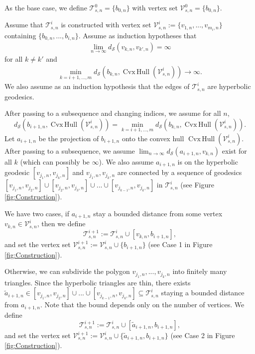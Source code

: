 \documentclass[11pt, reqno]{amsart}
\numberwithin{equation}{section}
\theoremstyle{plain}
\theoremstyle{theorem}
\theoremstyle{definition}
\DeclareMathOperator{\chull}{Cvx\, Hull}
\numberwithin{figure}{section}
\begin{document}
As the base case, we define $\mathcal{T}^0_{s,n} = \{b_{0,n}\}$ with vertex set $\mathcal{V}^0_{s,n}=\{b_{0,n}\}$.

Assume that $\mathcal{T}^i_{s,n}$ is constructed with vertex set $\mathcal{V}^i_{s,n}:= \{v_{1,n},..., v_{m_i,n}\}$ containing $\{b_{0,n},..., b_{i,n}\}$. 
Assume as induction hypotheses that 
\begin{align}\label{Eqn:H1}
\lim_{n\to\infty}d_{\mathcal{S}}(v_{k,n}, v_{k',n}) = \infty
\end{align}
for all $k\neq k'$ and 
\begin{align}\label{Eqn:H2}
\min_{k=i+1,..., m} d_{\mathcal{S}}(b_{k,n}, \chull(\mathcal{V}^{i}_{s, n})) \to \infty.
\end{align}
We also assume as an induction hypothesis that the edges of $\mathcal{T}^i_{s,n}$ are hyperbolic geodesics.

After passing to a subsequence and changing indices, we assume for all $n$,
$$
d_{\mathcal{S}}(b_{i+1,n}, \chull(\mathcal{V}^{i}_{s, n})) = \min_{k=i+1,..., m} d_{\mathcal{S}}(b_{k,n}, \chull(\mathcal{V}^{i}_{s, n})).
$$
Let $a_{i+1, n}$ be the projection of $b_{i+1,n}$ onto the convex hull $\chull(\mathcal{V}^i_{s, n})$.
After passing to a subsequence, we assume
$\lim_{n\to\infty} d_{\mathcal{S}}(a_{i+1, n}, v_{k,n})$
exist for all $k$ (which can possibly be $\infty$).
We also assume $a_{i+1, n}$ is on the hyperbolic geodesic $[v_{j_1,n}, v_{j_k,n}]$ and $v_{j_1,n}, v_{j_k,n}$ are connected by a sequence of geodesics $[v_{j_1,n}, v_{j_2,n}] \cup [v_{j_2,n}, v_{j_3,n}] \cup ... \cup [v_{j_{k-1}, n}, v_{j_k,n}]$ in $\mathcal{T}^i_{s, n}$ (see Figure \ref{fig:Construction}).

We have two cases, if $a_{i+1, n}$ stay a bounded distance from some vertex $v_{k,n} \in \mathcal{V}^i_{s, n}$, then we define
$$
\mathcal{T}^{i+1}_{s, n} := \mathcal{T}^{i}_{s, n} \cup [v_{k,n}, b_{i+1,n}],
$$
and set the vertex set $\mathcal{V}^{i+1}_{s, n}:=\mathcal{V}^i_{s, n} \cup \{b_{i+1,n}\}$ (see Case 1 in Figure \ref{fig:Construction}).

Otherwise, we can subdivide the polygon $v_{j_1,n},..., v_{j_k,n}$ into finitely many triangles. 
Since the hyperbolic triangles are thin, there exists $\tilde{a}_{i+1,n} \in [v_{j_1,n}, v_{j_2,n}] \cup ... \cup [v_{j_{k-1}, n}, v_{j_k,n}] \subseteq \mathcal{T}^i_{s, n}$ staying a bounded distance from $a_{i+1, n}$. Note that the bound depends only on the number of vertices.
We define 
$$
\mathcal{T}^{i+1}_{s, n} := \mathcal{T}^{i}_{s, n} \cup [\tilde{a}_{i+1,n}, b_{i+1,n}],
$$
and set the vertex set $\mathcal{V}^{i+1}_{s, n}:=\mathcal{V}^i_{s, n} \cup \{\tilde{a}_{i+1,n}, b_{i+1,n}\}$ (see Case 2 in Figure \ref{fig:Construction}).
\end{document}
